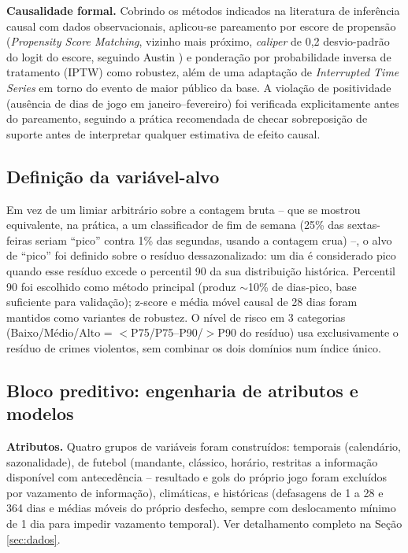 \documentclass[12pt]{article}
\begin{document}
\textbf{Causalidade formal.} Cobrindo os métodos indicados na literatura
de inferência causal com dados observacionais, aplicou-se pareamento por
escore de propensão (\emph{Propensity Score Matching}, vizinho mais
próximo, \emph{caliper} de 0,2 desvio-padrão do logit do escore, seguindo
Austin \cite{austin2011}) e ponderação por probabilidade inversa de
tratamento (IPTW) como robustez, além de uma adaptação de
\emph{Interrupted Time Series} em torno do evento de maior público da
base. A violação de positividade (ausência de dias de jogo em
janeiro--fevereiro) foi verificada explicitamente antes do pareamento,
seguindo a prática recomendada de checar sobreposição de suporte antes de
interpretar qualquer estimativa de efeito causal.

\subsection{Definição da variável-alvo}
\label{sec:definicao-pico}

Em vez de um limiar arbitrário sobre a contagem bruta -- que se mostrou
equivalente, na prática, a um classificador de fim de semana (25\% das
sextas-feiras seriam ``pico'' contra 1\% das segundas, usando a contagem
crua) --, o alvo de ``pico'' foi definido sobre o resíduo dessazonalizado:
um dia é considerado pico quando esse resíduo excede o percentil 90 da
sua distribuição histórica. Percentil 90 foi escolhido como método
principal (produz $\sim$10\% de dias-pico, base suficiente para
validação); z-score e média móvel causal de 28 dias foram mantidos como
variantes de robustez. O nível de risco em 3 categorias (Baixo/Médio/Alto
= $<$P75/P75--P90/$>$P90 do resíduo) usa exclusivamente o resíduo de
crimes violentos, sem combinar os dois domínios num índice único.

\subsection{Bloco preditivo: engenharia de atributos e modelos}
\label{sec:baselines}

\textbf{Atributos.} Quatro grupos de variáveis foram construídos:
temporais (calendário, sazonalidade), de futebol (mandante, clássico,
horário, restritas a informação disponível com antecedência -- resultado
e gols do próprio jogo foram excluídos por vazamento de informação),
climáticas, e históricas (defasagens de 1 a 28 e 364 dias e médias
móveis do próprio desfecho, sempre com deslocamento mínimo de 1 dia para
impedir vazamento temporal). Ver detalhamento completo na Seção
\ref{sec:dados}.
\end{document}
